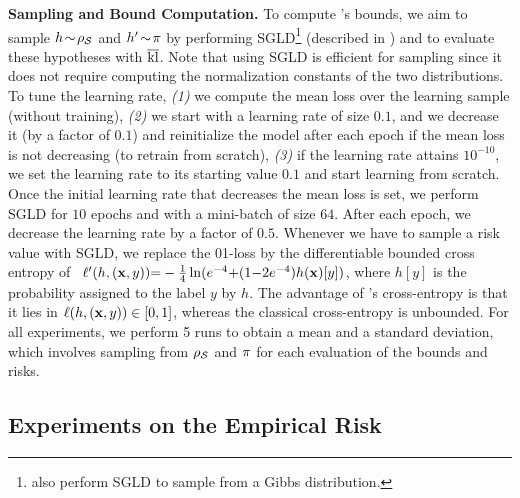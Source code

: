 \documentclass[twoside]{article}
\theoremstyle{plain}
\begin{document}
\textbf{Sampling and Bound Computation.}
To compute 's bounds, we aim to sample $h\!\sim\!\AQ$ and $h'\!\sim\!\P$ by performing SGLD\footnote{\citet{dziugaite2018data} also perform SGLD to sample from a Gibbs distribution.} (described in ) and to evaluate these hypotheses with $\klmax$.
Note that using SGLD is efficient for sampling since it does not require computing the normalization constants of the two distributions.
To tune the learning rate, {\it (1)} we compute the mean loss over the learning sample (without training), {\it (2)} we start with a learning rate of size $0.1$, and we decrease it (by a factor of $0.1$) and reinitialize the model after each epoch if the mean loss is not decreasing (to retrain from scratch), {\it (3)} if the learning rate attains $10^{-10}$, we set the learning rate to its starting value $0.1$ and start learning from scratch.
Once the initial learning rate that decreases the mean loss is set, we perform SGLD for $10$ epochs and with a mini-batch of size $64$.
After each epoch, we decrease the learning rate by a factor of $0.5$.
Whenever we have to sample a risk value with SGLD, we replace the 01-loss by the differentiable bounded cross entropy of~\citet{dziugaite2018data} $\loss'(h, (\xbf,y)) {=} -\frac{1}{4}\ln(e^{-4}{+}(1{-}2e^{-4})h(\xbf)[y])$, where $h[y]$ is the probability assigned to the label $y$ by $h$.
The advantage of \citet{dziugaite2018data}'s cross-entropy is that it lies in $\loss(h, (\xbf,y)) \in [0,1]$, whereas the classical cross-entropy is unbounded.
For all experiments, we perform 5 runs to obtain a mean and a standard deviation, which involves sampling from $\AQ$ and $\P$ for each evaluation of the bounds and risks.

\subsection{Experiments on the Empirical Risk}
\label{sec:experiments-emp-risk}
\end{document}
